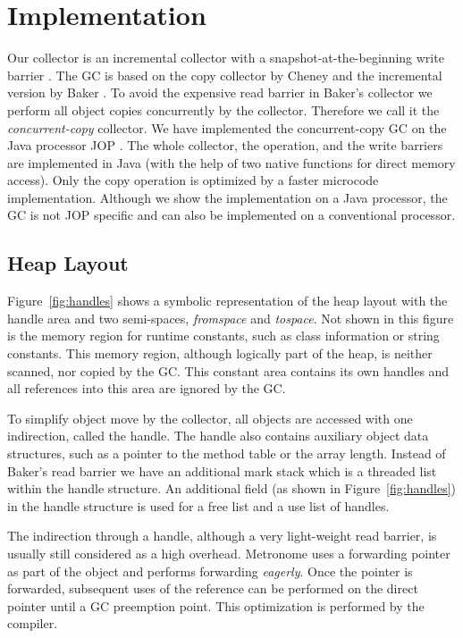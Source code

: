 \section{Implementation}

Our collector is an incremental collector with a
snapshot-at-the-beginning write barrier \cite{gc:yuasa90}. The GC is
based on the copy collector by Cheney \cite{gc:cheney70} and the
incremental version by Baker \cite{gc:baker78}. To avoid the
expensive read barrier in Baker's collector we perform all object
copies concurrently by the collector. Therefore we call it the
\emph{concurrent-copy} collector. We have implemented the
concurrent-copy GC on the Java processor JOP \cite{jop:thesis,
jop:jnl:jsa2007}. The whole collector, the  operation, and
the write barriers are implemented in Java (with the help of two
native functions for direct memory access). Only the copy operation
is optimized by a faster microcode implementation. Although we show
the implementation on a Java processor, the GC is not JOP specific
and can also be implemented on a conventional processor.

\subsection{Heap Layout}

Figure~\ref{fig:handles} shows a symbolic representation of the heap
layout with the handle area and two semi-spaces, \emph{fromspace} and
\emph{tospace}. Not shown in this figure is the memory region for
runtime constants, such as class information or string constants.
This memory region, although logically part of the heap, is neither
scanned, nor copied by the GC. This constant area contains its own
handles and all references into this area are ignored by the GC.

To simplify object move by the collector, all objects are accessed
with one indirection, called the handle. The handle also contains
auxiliary object data structures, such as a pointer to the method
table or the array length. Instead of Baker's read barrier we have an
additional mark stack which is a threaded list within the handle
structure. An additional field (as shown in Figure~\ref{fig:handles})
in the handle structure is used for a free list and a use list of
handles.

The indirection through a handle, although a very light-weight read
barrier, is usually still considered as a high overhead. Metronome
\cite{gc:bacon03} uses a forwarding pointer as part of the object and
performs forwarding \emph{eagerly}. Once the pointer is forwarded,
subsequent uses of the reference can be performed on the direct
pointer until a GC preemption point. This optimization is performed
by the compiler.

